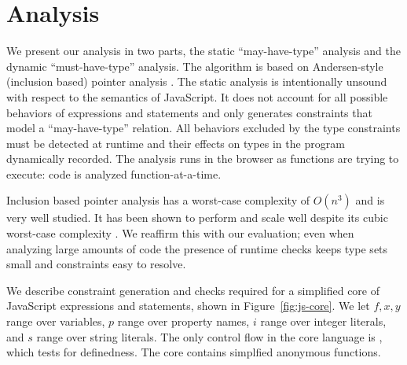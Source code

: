 \section{Analysis}
\label{sec:analysis}

We present our analysis in two parts, the static ``may-have-type'' analysis
and the dynamic ``must-have-type'' analysis. The algorithm is based on
Andersen-style (inclusion based) pointer analysis \cite{AndersenPhD}. The
static analysis is
intentionally unsound with respect to the semantics of
JavaScript. It does not account for all possible behaviors of expressions and
statements and only generates constraints that model a ``may-have-type''
relation. All behaviors excluded by the type constraints must be detected at
runtime and their effects on types in the program dynamically recorded. The
analysis runs in the browser as functions are trying to execute: code is
analyzed function-at-a-time.

Inclusion based pointer analysis has a worst-case complexity of $O(n^3)$
and is very
well studied. It has been shown to
perform and scale well despite its cubic worst-case complexity
\cite{Sridharan09}.
We reaffirm this with our evaluation;
even when analyzing large amounts of code the presence of runtime checks keeps type sets
small and constraints easy to resolve.

%
%
%
%
%
%

We describe constraint generation and checks required for a simplified core of
JavaScript expressions and statements, shown in Figure~\ref{fig:js-core}. We
let $f,x,y$ range over variables, $p$ range over property names, $i$ range over
integer literals, and $s$ range over string literals. The only control flow in
the core language is , which tests for definedness. The core contains
simplfied anonymous functions.

